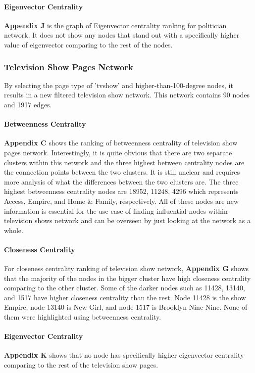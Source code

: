 \documentclass[11pt,twocolumn]{article}
\begin{document}
\paragraph{Eigenvector Centrality}
\textbf{Appendix J} is the graph of Eigenvector centrality ranking for politician network. It does not show any nodes that stand out with a specifically higher value of eigenvector comparing to the rest of the nodes.

\subsubsection{Television Show Pages Network}
By selecting the page type of 'tvshow' and higher-than-100-degree nodes, it results in a new filtered television show network. This network contains 90 nodes and 1917 edges.

\paragraph{Betweenness Centrality}
\textbf{Appendix C} shows the ranking of betweenness centrality of television show pages network. Interestingly, it is quite obvious that there are two separate clusters within this network and the three highest between centrality nodes are the connection points between the two clusters. It is still unclear and requires more analysis of what the differences between the two clusters are. The three highest betweenness centrality nodes are 18952, 11248, 4296 which represents Access, Empire, and Home \& Family, respectively. All of these nodes are new information is essential for the use case of finding influential nodes within television shows network and can be overseen by just looking at the network as a whole. 


\paragraph{Closeness Centrality}
For closeness centrality ranking of television show network, \textbf{Appendix G} shows that the majority of the nodes in the bigger cluster have high closeness centrality comparing to the other cluster. Some of the darker nodes such as 11428, 13140, and 1517 have higher closeness centrality than the rest. Node 11428 is the show Empire, node 13140 is New Girl, and node 1517 is Brooklyn Nine-Nine. None of them were highlighted using betweenness centrality. 

\paragraph{Eigenvector Centrality}
\textbf{Appendix K} shows that no node has specifically higher eigenvector centrality comparing to the rest of the television show pages.
\end{document}
